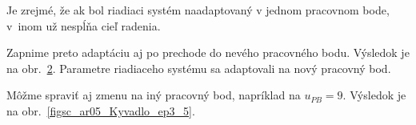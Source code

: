 \documentclass[a4paper, 10pt, ]{article}
\begin{document}
\begin{figure}[!b]
	\centering

    \vspace{-3mm}


    \vspace{-2mm}

	\caption{}
	\label{figsc_ar05_Kyvadlo_ep3_3}

    \vspace{-2mm}

\end{figure}



Je zrejmé, že ak bol riadiaci systém naadaptovaný v jednom pracovnom bode, v~inom už nespĺňa cieľ radenia.



Zapnime preto adaptáciu aj po prechode do nevého pracovného bodu. Výsledok je na obr.~\ref{figsc_ar05_Kyvadlo_ep3_4}. Parametre riadiaceho systému sa adaptovali na nový pracovný bod.





\begin{figure}[!t]
	\centering

    \vspace{-3mm}


    \vspace{-2mm}

	\caption{}
	\label{figsc_ar05_Kyvadlo_ep3_4}

    \vspace{-2mm}

\end{figure}





Môžme spraviť aj zmenu na iný pracovný bod, napríklad na  $u_{PB} = 9$. Výsledok je na obr.~\ref{figsc_ar05_Kyvadlo_ep3_5}.



\vfill

\phantom{}
\end{document}
